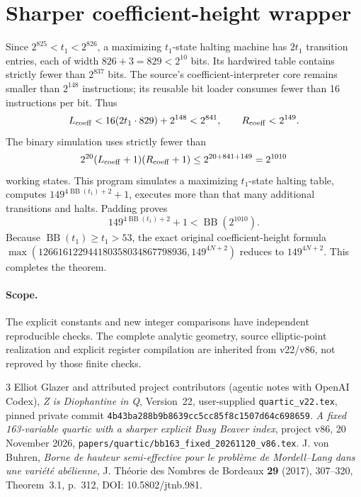 \documentclass[11pt]{article}
\newcommand{\BB}{\operatorname{BB}}
\begin{document}
\section{Sharper coefficient-height wrapper}
Since $2^{825}<t_1<2^{826}$, a maximizing
$t_1$-state halting machine has $2t_1$ transition entries,
each of width $826+3=829<2^{10}$ bits.
Its hardwired table contains strictly fewer than $2^{837}$ bits.
The source's coefficient-interpreter core remains smaller than
$2^{148}$ instructions; its reusable bit loader consumes fewer
than 16 instructions per bit. Thus
\[
 L_{\rm coeff}<16(2t_1\cdot829)+2^{148}<2^{841},\qquad
 R_{\rm coeff}<2^{149}.
\]
The binary simulation uses strictly fewer than
\[
 2^{20}(L_{\rm coeff}+1)(R_{\rm coeff}+1)
 \le2^{20+841+149}=2^{1010}
\]
working states. This program simulates a maximizing
$t_1$-state halting table, computes
$149^{4\BB(t_1)+2}+1$, executes more than that many
additional transitions and halts. Padding proves
\[
 149^{4\BB(t_1)+2}+1<\BB(2^{1010}).
\]
Because $\BB(t_1)\ge t_1>53$, the exact original
coefficient-height formula
$\max(126616122944180358034867798936,149^{4N+2})$
reduces to $149^{4N+2}$. This completes the theorem.

\paragraph{Scope.}
The explicit constants and new integer comparisons have independent
reproducible checks. The complete analytic geometry, source
elliptic-point realization and explicit register compilation
are inherited from v22/v86, not reproved by those finite checks.

\begin{thebibliography}{3}
 Elliot Glazer and attributed project contributors (agentic notes with OpenAI Codex), \emph{Z is Diophantine in Q}, Version~22,
user-supplied \texttt{quartic\_v22.tex}, pinned private commit
\texttt{4b43ba288b9b8639cc5cc85f8c1507d64c698659}.
 \emph{A fixed 163-variable quartic with a sharper
explicit Busy Beaver index}, project v86, 20 November 2026,
\texttt{papers/quartic/bb163\_fixed\_20261120\_v86.tex}.
 J. von Buhren,
\emph{Borne de hauteur semi-effective pour le
probl\`eme de Mordell--Lang dans une vari\'et\'e ab\'elienne},
J. Th\'eorie des Nombres de Bordeaux \textbf{29} (2017),
307--320, Theorem~3.1, p.~312, DOI: 10.5802/jtnb.981.
\end{thebibliography}
\end{document}
